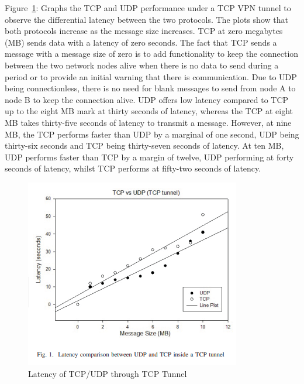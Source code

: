 \documentclass[conference]{IEEEtran}
\begin{document}
      Figure~\ref{fig:tcpudp-tcptun}: Graphs the TCP and UDP performance under a TCP VPN tunnel to observe the differential latency between the two protocols. The plots show that both protocols increase as the message size increases. TCP at zero megabytes (MB) sends data with a latency of zero seconds. The fact that TCP sends a message with a message size of zero is to add functionality to keep the connection between the two network nodes alive when there is no data to send during a period or to provide an initial warning that there is communication. Due to UDP being connectionless, there is no need for blank messages to send from node A to node B to keep the connection alive. UDP offers low latency compared to TCP up to the eight MB mark at thirty seconds of latency, whereas the TCP at eight MB takes thirty-five seconds of latency to transmit a message. However, at nine MB, the TCP performs faster than UDP by a marginal of one second, UDP being thirty-six seconds and TCP being thirty-seven seconds of latency. At ten MB, UDP performs faster than TCP by a margin of twelve, UDP performing at forty seconds of latency, whilst TCP performs at fifty-two seconds of latency.
      \begin{figure}[h]
        \centering
        \includegraphics[width=0.70\columnwidth]{Figures/TCPUDP-TCPTUN.png}
        \caption{Latency of TCP/UDP through TCP Tunnel~\cite{coonjah_experimental_2015}}
        \label{fig:tcpudp-tcptun}
      \end{figure}
\end{document}

